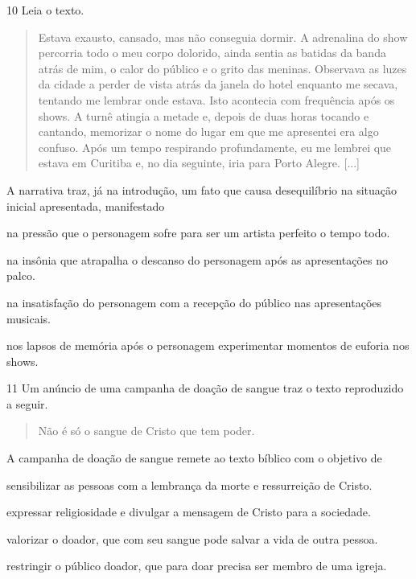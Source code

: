 \num{10} Leia o texto.

\begin{quote}
Estava exausto, cansado, mas não conseguia dormir. A adrenalina do show
percorria todo o meu corpo dolorido, ainda sentia as batidas da banda
atrás de mim, o calor do público e o grito das meninas. Observava as
luzes da cidade a perder de vista atrás da janela do hotel enquanto me
secava, tentando me lembrar onde estava. Isto acontecia com frequência
após os shows. A turnê atingia a metade e, depois de duas horas tocando
e cantando, memorizar o nome do lugar em que me apresentei era algo
confuso. Após um tempo respirando profundamente, eu me lembrei que
estava em Curitiba e, no dia seguinte, iria para Porto Alegre. {[}...{]}

\end{quote}

A narrativa traz, já na introdução, um fato que causa desequilíbrio na
situação inicial apresentada, manifestado

\begin{escolha}
\item na pressão que o personagem sofre para ser um artista perfeito o
tempo todo.

\item na insônia que atrapalha o descanso do personagem após as
apresentações no palco.

\item na insatisfação do personagem com a recepção do público nas
apresentações musicais.

\item nos lapsos de memória após o personagem experimentar momentos de
euforia nos shows.
\end{escolha}

\num{11} Um anúncio de uma campanha de doação de sangue traz o texto reproduzido a seguir.

\begin{quote}
\centering Não é só o sangue de Cristo que tem poder.
\end{quote}


A campanha de doação de sangue remete ao texto bíblico com o objetivo de

\begin{escolha}
\item sensibilizar as pessoas com a lembrança da morte e ressurreição de
Cristo.
\item expressar religiosidade e divulgar a mensagem de Cristo para a
sociedade.
\item valorizar o doador, que com seu sangue pode salvar a vida de outra
pessoa.
\item restringir o público doador, que para doar precisa ser membro de uma
igreja.
\end{escolha}

